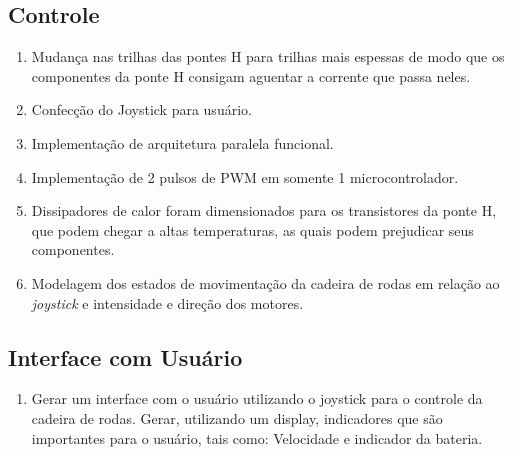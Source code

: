     \subsection{Controle}
      \begin{enumerate}
        \item Mudança nas trilhas das pontes H para trilhas mais espessas de modo que os componentes da ponte H consigam aguentar a corrente que passa neles.
         \item Confecção do Joystick para usuário.
         \item Implementação de arquitetura paralela funcional.
         \item Implementação de 2 pulsos de PWM em somente 1 microcontrolador.
         \item Dissipadores de calor foram dimensionados para os transistores da ponte H, que podem chegar a altas temperaturas, as quais podem prejudicar seus componentes.
         \item Modelagem dos estados de movimentação da cadeira de rodas em relação ao \textit{joystick} e intensidade e direção dos motores.

      \end{enumerate}

  \subsection{Interface com Usuário}
    \begin{enumerate}
      \item Gerar um interface com o usuário utilizando o joystick para o controle da cadeira de rodas. Gerar, utilizando um display, indicadores que são importantes para o usuário, tais como: Velocidade e indicador da bateria.
    \end{enumerate}

